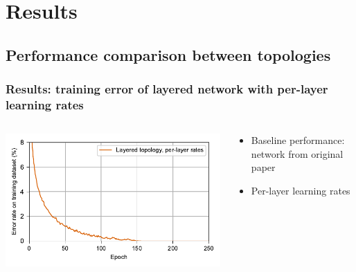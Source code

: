 \documentclass[pdf]{beamer}
\begin{document}
\section{Results}
\subsection{Performance comparison between topologies}
\begin{frame}
	\frametitle{Results: training error of layered network with per-layer learning rates}
	\begin{columns}
	\begin{column}{.6\textwidth}
		\includegraphics[width=\textwidth]{figures/performance_original.pdf}
	\end{column}
	\begin{column}{.4\textwidth}
	\begin{itemize}
		\item<1-> Baseline performance: network from original paper
		\item<2-> Per-layer learning rates
	\end{itemize}
	\end{column}
	\end{columns}
\end{frame}
\end{document}
